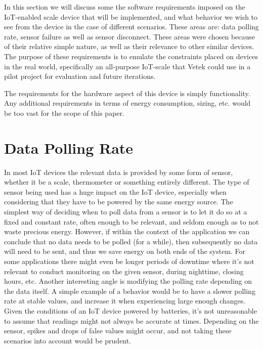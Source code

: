 





In this section we will discuss some the software requirements imposed on the IoT-enabled scale device that will be implemented, and what behavior we wish to see from the device in the case of different scenarios. These areas are: data polling rate, sensor failure as well as sensor disconnect. These areas were chosen because of their relative simple nature, as well as their relevance to other similar devices. The purpose of these requirements is to emulate the constraints placed on devices in the real world, specifically an all-purpose IoT-scale that Vetek could use in a pilot project for evaluation and future iterations. 

The requirements for the hardware aspect of this device is simply functionality. Any additional requirements in terms of energy consumption, sizing, etc. would be too vast for the scope of this paper. 

\section{Data Polling Rate}
In most IoT devices the relevant data is provided by some form of sensor, whether it be a scale, thermometer or something entirely different.\cite{what_is_iot} The type of sensor being used has a huge impact on the IoT device, especially when considering that they have to be powered by the same energy source. The simplest way of deciding when to poll data from a sensor is to let it do so at a fixed and constant rate, often enough to be relevant, and seldom enough as to not waste precious energy. However, if within the context of the application we can conclude that no data needs to be polled (for a while), then subsequently no data will need to be sent, and thus we save energy on both ends of the system. For some applications there might even be longer periods of downtime where it's not relevant to conduct monitoring on the given sensor, \eg during nighttime, closing hours, etc. Another interesting angle is modifying the polling rate depending on the data itself. A simple example of a behavior would be to have a slower polling rate at stable values, and increase it when experiencing large enough changes. Given the conditions of an IoT device powered by batteries, it's not unreasonable to assume that readings might not always be accurate at times. Depending on the sensor, spikes and drops of false values might occur, and not taking these scenarios into account would be prudent. 

